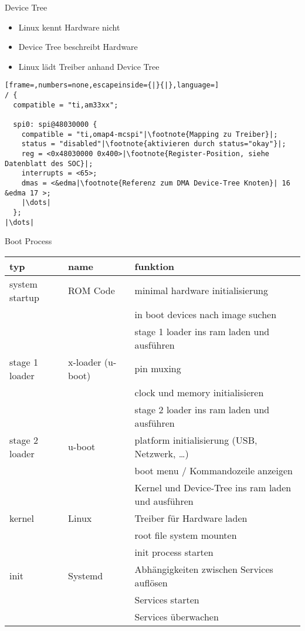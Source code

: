 \begin{frame}[fragile]{Device Tree}
	\begin{multicols}{2}
		\begin{itemize}
			\item Linux kennt Hardware nicht
			\item Device Tree beschreibt Hardware
			\item Linux lädt Treiber anhand Device Tree
		\end{itemize}
		\pagebreak
		\begin{lstlisting}[frame=,numbers=none,escapeinside={|}{|},language=]
/ {
  compatible = "ti,am33xx";

  spi0: spi@48030000 {
    compatible = "ti,omap4-mcspi"|\footnote{Mapping zu Treiber}|;
    status = "disabled"|\footnote{aktivieren durch status="okay"}|;
    reg = <0x48030000 0x400>|\footnote{Register-Position, siehe Datenblatt des SOC}|;
    interrupts = <65>;
    dmas = <&edma|\footnote{Referenz zum DMA Device-Tree Knoten}| 16 &edma 17 >;
    |\dots|
  };
|\dots|
		\end{lstlisting}
	\end{multicols}
\end{frame}

\begin{frame}{Boot Process \cite{OMAPBootloaderOverview}}
	\begin{tabular}{|l|l|l|}
		\hline typ & name & funktion \\ 
		\hline system startup & ROM Code & minimal hardware initialisierung \\ 
		& & in boot devices nach image suchen \\
		& & stage 1 loader ins ram laden und ausführen \\
		
		\hline stage 1 loader & x-loader (u-boot) & pin muxing \\ 
		& & clock und memory initialisieren \\
		& & stage 2 loader ins ram laden und ausführen \\
		
		\hline stage 2 loader & u-boot & platform initialisierung (USB, Netzwerk, \ldots) \\
		& & boot menu / Kommandozeile anzeigen \\
		& & Kernel und Device-Tree ins ram laden und ausführen \\
		
		\hline kernel & Linux & Treiber für Hardware laden \\ 
		& & root file system mounten \\
		& & init process starten \\
		
		\hline init & Systemd & Abhängigkeiten zwischen Services auflösen \\ 
		& & Services starten \\
		& & Services überwachen \\
		
		\hline 
	\end{tabular} 
\end{frame}

